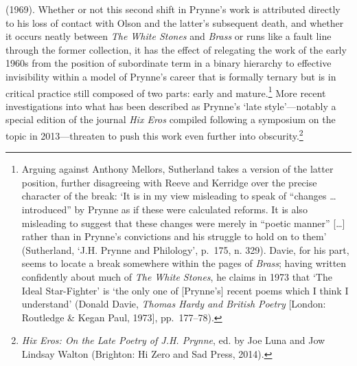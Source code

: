 \documentclass[]{article}
\begin{document}
(1969). Whether or not this second shift in Prynne's work is attributed
directly to his loss of contact with Olson and the latter's subsequent
death, and whether it occurs neatly between \emph{The White Stones} and
\emph{Brass} or runs like a fault line through the former collection, it
has the effect of relegating the work of the early 1960s from the
position of subordinate term in a binary hierarchy to effective
invisibility within a model of Prynne's career that is formally ternary
but is in critical practice still composed of two parts: early and
mature.\footnote{Arguing against Anthony Mellors, Sutherland takes a
  version of the latter position, further disagreeing with Reeve and
  Kerridge over the precise character of the break: `It is in my view
  misleading to speak of ``changes \ldots{} introduced'' by Prynne as if
  these were calculated reforms. It is also misleading to suggest that
  these changes were merely in ``poetic manner'' {[}\ldots{}{]} rather
  than in Prynne's convictions and his struggle to hold on to them'
  (Sutherland, `J.H. Prynne and Philology', p.~175, n. 329). Davie, for
  his part, seems to locate a break somewhere within the pages of
  \emph{Brass}; having written confidently about much of \emph{The White
  Stones}, he claims in 1973 that `The Ideal Star-Fighter' is `the only
  one of {[}Prynne's{]} recent poems which I think I understand' (Donald
  Davie, \emph{Thomas Hardy and British Poetry} {[}London: Routledge \&
  Kegan Paul, 1973{]}, pp.~177--78).} More recent investigations into
what has been described as Prynne's `late style'---notably a special
edition of the journal \emph{Hix Eros} compiled following a symposium on
the topic in 2013---threaten to push this work even further into
obscurity.\footnote{\emph{Hix Eros: On the Late Poetry of J.H. Prynne},
  ed. by Joe Luna and Jow Lindsay Walton (Brighton: Hi Zero and Sad
  Press, 2014).}
\end{document}
